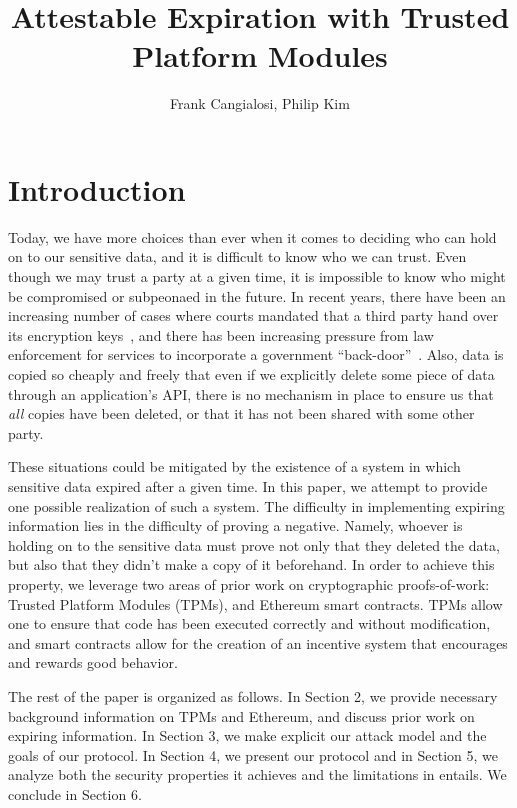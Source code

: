 \documentclass{article}
\begin{document}
\title{Attestable Expiration with Trusted Platform Modules}
\author{Frank Cangialosi, Philip Kim}

\maketitle

\section{Introduction}

Today, we have more choices than ever when it comes to deciding who can hold on to our sensitive data, and it is difficult to know who we can trust. Even though we may trust a party at a given time, it is impossible to know who might be compromised or subpeonaed in the future. In recent years, there have been an increasing number of cases where courts mandated that a third party hand over its encryption keys~\cite{hushmail}, and there has been increasing pressure from law enforcement for services to incorporate a government ``back-door''~\cite{backdoor}. Also, data is copied so cheaply and freely that even if we explicitly delete some piece of data through an application's API, there is no mechanism in place to ensure us that \textit{all} copies have been deleted, or that it has not been shared with some other party.


These situations could be mitigated by the existence of a system in which sensitive data expired after a given time. In this paper, we attempt to provide one possible realization of such a system. The difficulty in implementing expiring information lies in the difficulty of proving a negative. Namely, whoever is holding on to the sensitive data must prove not only that they deleted the data, but also that they didn't make a copy of it beforehand. In order to achieve this property, we leverage two areas of prior work on cryptographic proofs-of-work: Trusted Platform Modules (TPMs), and Ethereum smart contracts. TPMs allow one to ensure that code has been executed correctly and without modification, and smart contracts allow for the creation of an incentive system that encourages and rewards good behavior.

The rest of the paper is organized as follows. In Section 2, we provide necessary background information on TPMs and Ethereum, and discuss prior work on expiring information. In Section 3, we make explicit our attack model and the goals of our protocol. In Section 4, we present our protocol and in Section 5, we analyze both the security properties it achieves and the limitations in entails. We conclude in Section 6.
\end{document}
